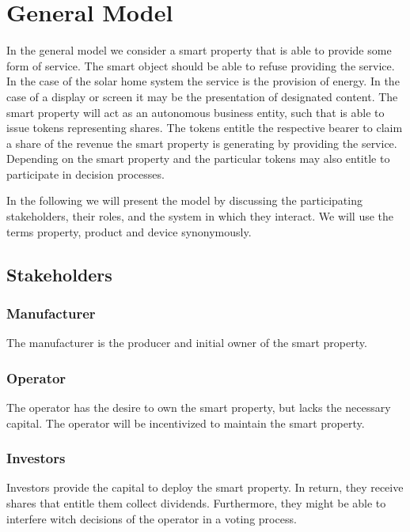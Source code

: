\section{General Model}

In the general model we consider a smart property that is able to provide some form of service. The smart object should be able to refuse providing the service. In the case of the solar home system the service is the provision of energy. In the case of a display or screen it may be the presentation of designated content. The smart property will act as an autonomous business entity, such that is able to issue tokens representing shares. The tokens entitle the respective bearer to claim a share of the revenue the smart property is generating by providing the service. Depending on the smart property and the particular tokens may also entitle to participate in decision processes.

In the following we will present the model by discussing the participating stakeholders, their roles, and the system in which they interact. We will use the terms property, product and device synonymously. 

\subsection{Stakeholders}

\subsubsection{Manufacturer}

The manufacturer is the producer and initial owner of the smart property.

\subsubsection{Operator}

The operator has the desire to own the smart property, but lacks the necessary capital. The operator will be incentivized to maintain the smart property.

\subsubsection{Investors}

Investors provide the capital to deploy the smart property. In return, they receive shares that entitle them collect dividends. Furthermore, they might be able to interfere witch decisions of the operator in a voting process.

